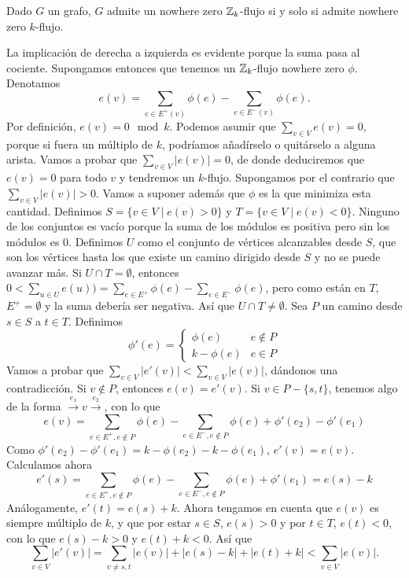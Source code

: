 \documentclass[TGyGC.tex]{subfiles}
\begin{document}
\begin{teorema}
Dado $G$ un grafo, $G$ admite un nowhere zero $\mathbb{Z}_k$-flujo si y solo si admite nowhere zero $k$-flujo.
\end{teorema}
\begin{dem}
La implicación de derecha a izquierda es evidente porque la suma pasa al cociente. Supongamos entonces que tenemos un $\mathbb{Z}_k$-flujo nowhere zero $\phi$. Denotamos $$e(v)=\sum_{e\in E^+(v)}\phi(e)-\sum_{e\in E^-(v)}\phi(e).$$
Por definición, $e(v)=0\mod k$. Podemos asumir que $\sum_{v\in V}e(v)=0$, porque si fuera un múltiplo de $k$, podríamos añadírselo o quitárselo a alguna arista. Vamos a probar que $\sum_{v\in V}|e(v)|=0$, de donde deduciremos que $e(v)=0$ para todo $v$ y tendremos un $k$-flujo. Supongamos por el contrario que $\sum_{v\in V}|e(v)|>0$. Vamos a suponer además que $\phi$ es la que minimiza esta cantidad. Definimos $S=\{v\in V\mid e(v)>0\}$ y $T=\{v\in V\mid e(v)<0\}$. Ninguno de los conjuntos es vacío porque la suma de los módulos es positiva pero sin los módulos es 0. Definimos $U$ como el conjunto de vértices alcanzables desde $S$, que son los vértices hasta los que existe un camino dirigido desde $S$ y no se puede avanzar más. Si $U\cap T=\emptyset$, entonces $0<\sum_{u\in U}e(u))=\sum_{e\in E^+}\phi(e)-\sum_{e\in E^-}\phi(e)$, pero como están en $T$, $E^+=\emptyset$ y la suma debería ser negativa. Así que $U\cap T\neq\emptyset$. Sea $P$ un camino desde $s\in S$ a $t\in T$. Definimos
\[
\phi'(e)=\begin{cases}
\phi(e) & e\notin P\\
k-\phi(e) & e\in P
\end{cases}
\]
Vamos a probar que $\sum_{v\in V}|e'(v)|<\sum_{v\in V}|e(v)|$, dándonos una contradicción. Si $v\notin P$, entonces $e(v)=e'(v)$. Si $v\in P-\{s,t\}$, tenemos algo de la forma $\xrightarrow{e_1}v\xrightarrow{e_2}$, con lo que $$e(v)=\sum_{e\in E^+,e\notin P}\phi(e)-\sum_{e\in E^-, e\notin P}\phi(e)+\phi'(e_2)-\phi'(e_1)$$
Como $\phi'(e_2)-\phi'(e_1)=k-\phi(e_2)-k-\phi(e_1)$, $e'(v)=e(v)$. Calculamos ahora
\[
e'(s)=\sum_{e\in E^+, e\notin P}\phi(e)-\sum_{e\in E^-, e\notin P}\phi(e)+\phi'(e_1)=e(s)-k
\]
Análogamente, $e'(t)=e(s)+k$. Ahora tengamos en cuenta que $e(v)$ es siempre múltiplo de $k$, y que por estar $s\in S$, $e(s)>0$ y por $t\in T$, $e(t)<0$, con lo que $e(s)-k>0$ y $e(t)+k<0$. Así que
\[
\sum_{v\in V}|e'(v)|=\sum_{v\neq s,t}|e(v)|+|e(s)-k|+|e(t)+k|<\sum_{v\in V}|e(v)|.
\]
\end{dem}
\end{document}
